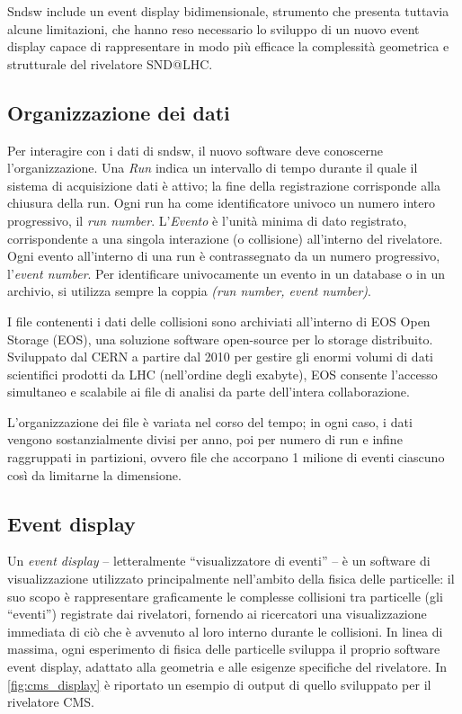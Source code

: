 Sndsw include un event display bidimensionale, strumento che presenta tuttavia alcune limitazioni, che hanno reso necessario lo sviluppo di un nuovo event display capace di rappresentare in modo più efficace la complessità geometrica e strutturale del rivelatore SND@LHC.\@

\subsection{Organizzazione dei dati}
Per interagire con i dati di sndsw, il nuovo software deve conoscerne l'organizzazione.
Una \emph{Run} indica un intervallo di tempo durante il quale il sistema di acquisizione dati è attivo; la fine della registrazione corrisponde alla chiusura della run.
Ogni run ha come identificatore univoco un numero intero progressivo, il \emph{run number}.
L’\emph{Evento} è l’unità minima di dato registrato, corrispondente a una singola interazione (o collisione) all’interno del rivelatore. Ogni evento all’interno di una run è contrassegnato da un numero progressivo, l'\emph{event number}.
Per identificare univocamente un evento in un database o in un archivio, si utilizza sempre la coppia \emph{(run number, event number)}.

I file contenenti i dati delle collisioni sono archiviati all'interno di EOS Open Storage (EOS), una soluzione software open-source per lo storage distribuito. Sviluppato dal CERN a partire dal 2010 per gestire gli enormi volumi di dati scientifici prodotti da LHC (nell'ordine degli exabyte), EOS consente l'accesso simultaneo e scalabile ai file di analisi da parte dell'intera collaborazione.

L'organizzazione dei file è variata nel corso del tempo; in ogni caso, i dati vengono sostanzialmente divisi per anno, poi per numero di run e infine raggruppati in partizioni, ovvero file che accorpano 1 milione di eventi ciascuno così da limitarne la dimensione.

\subsection{Event display}
Un \emph{event display} -- letteralmente “visualizzatore di eventi” -- è un software di visualizzazione utilizzato principalmente nell'ambito della fisica delle particelle: il suo scopo è rappresentare graficamente le complesse collisioni tra particelle (gli “eventi”) registrate dai rivelatori, fornendo ai ricercatori una visualizzazione immediata di ciò che è avvenuto al loro interno durante le collisioni.
In linea di massima, ogni esperimento di fisica delle particelle sviluppa il proprio software event display, adattato alla geometria e alle esigenze specifiche del rivelatore.
In \cref{fig:cms_display} è riportato un esempio di output di quello sviluppato per il rivelatore CMS.\@

